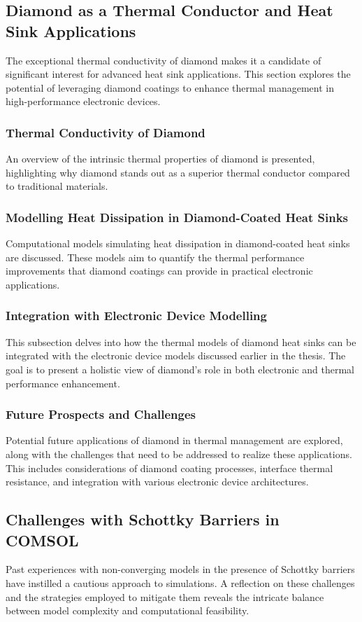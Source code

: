 \subsection{Diamond as a Thermal Conductor and Heat Sink Applications}
The exceptional thermal conductivity of diamond makes it a candidate of significant interest for advanced heat sink applications. This section explores the potential of leveraging diamond coatings to enhance thermal management in high-performance electronic devices.

\subsubsection{Thermal Conductivity of Diamond}
An overview of the intrinsic thermal properties of diamond is presented, highlighting why diamond stands out as a superior thermal conductor compared to traditional materials.

\subsubsection{Modelling Heat Dissipation in Diamond-Coated Heat Sinks}
Computational models simulating heat dissipation in diamond-coated heat sinks are discussed. These models aim to quantify the thermal performance improvements that diamond coatings can provide in practical electronic applications.

\subsubsection{Integration with Electronic Device Modelling}
This subsection delves into how the thermal models of diamond heat sinks can be integrated with the electronic device models discussed earlier in the thesis. The goal is to present a holistic view of diamond's role in both electronic and thermal performance enhancement.

\subsubsection{Future Prospects and Challenges}
Potential future applications of diamond in thermal management are explored, along with the challenges that need to be addressed to realize these applications. This includes considerations of diamond coating processes, interface thermal resistance, and integration with various electronic device architectures.

\subsection{Challenges with Schottky Barriers in COMSOL}
Past experiences with non-converging models in the presence of Schottky barriers have instilled a cautious approach to simulations. A reflection on these challenges and the strategies employed to mitigate them reveals the intricate balance between model complexity and computational feasibility.

